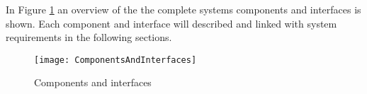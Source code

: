 \documentclass[Main]{subfiles}
\begin{document}
In Figure \ref{fig:ComponentsAndInterfaces} an overview of the the complete systems components and interfaces is shown. Each component and interface will described and linked with system requirements in the following sections.

\begin{figure}[H]
\centering
\texttt{[image: ComponentsAndInterfaces]}
\caption{Components and interfaces}
\label{fig:ComponentsAndInterfaces}
\end{figure}


\newpage

\newpage

\end{document}
